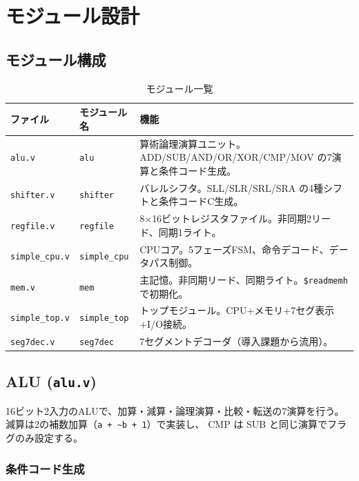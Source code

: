 \documentclass[a4paper,11pt]{ltjsarticle}
\begin{document}
\section{モジュール設計}

\subsection{モジュール構成}

\begin{table}[h]
\centering
\caption{モジュール一覧}
\label{tab:modules}
\begin{tabular}{llp{8cm}}
\toprule
ファイル & モジュール名 & 機能 \\
\midrule
\texttt{alu.v}        & \texttt{alu}        & 算術論理演算ユニット。ADD/SUB/AND/OR/XOR/CMP/MOV の7演算と条件コード生成。 \\
\texttt{shifter.v}    & \texttt{shifter}    & バレルシフタ。SLL/SLR/SRL/SRA の4種シフトと条件コードC生成。 \\
\texttt{regfile.v}    & \texttt{regfile}    & 8$\times$16ビットレジスタファイル。非同期2リード、同期1ライト。 \\
\texttt{simple\_cpu.v} & \texttt{simple\_cpu} & CPUコア。5フェーズFSM、命令デコード、データパス制御。 \\
\texttt{mem.v}        & \texttt{mem}        & 主記憶。非同期リード、同期ライト。\texttt{\$readmemh}で初期化。 \\
\texttt{simple\_top.v} & \texttt{simple\_top} & トップモジュール。CPU+メモリ+7セグ表示+I/O接続。 \\
\texttt{seg7dec.v}    & \texttt{seg7dec}    & 7セグメントデコーダ（導入課題から流用）。 \\
\bottomrule
\end{tabular}
\end{table}

\subsection{ALU (\texttt{alu.v})}

16ビット2入力のALUで、加算・減算・論理演算・比較・転送の7演算を行う。
減算は2の補数加算（\texttt{a + \~{}b + 1}）で実装し、
CMP は SUB と同じ演算でフラグのみ設定する。



\subsubsection{条件コード生成}
\end{document}
